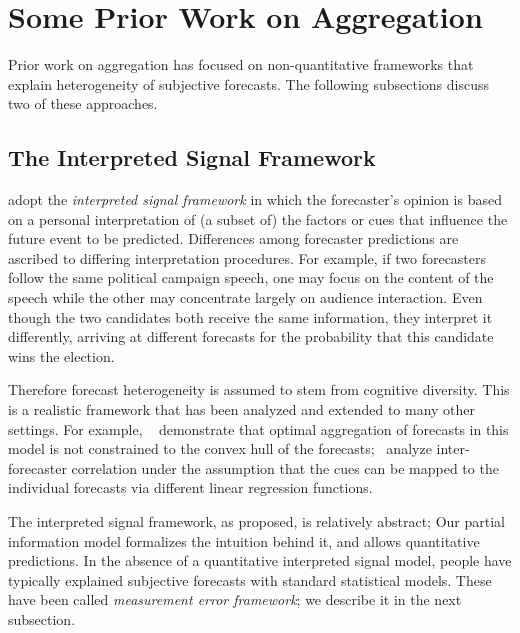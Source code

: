 \documentclass[11pt]{article}
\theoremstyle{definition}
\theoremstyle{definition}
\begin{document}
\section{Some Prior Work on Aggregation}
\label{sec:prior}

Prior work on aggregation has focused on non-quantitative frameworks
that explain heterogeneity of subjective forecasts.  The following
subsections discuss two of these approaches.

\subsection{The Interpreted Signal Framework}
\label{ss:inerpreted}

\citet{hong2009interpreted} adopt the {\em interpreted signal
framework} in which the forecaster's opinion is based on a personal
interpretation of (a subset of) the factors or cues that influence the
future event to be predicted.  Differences among forecaster
predictions are ascribed to differing interpretation procedures.  For
example, if two forecasters follow the same political campaign speech,
one may focus on the content of the speech while the other may
concentrate largely on audience interaction.  Even though the two
candidates both receive the same information, they interpret it
differently, arriving at different forecasts for the probability that
this candidate wins the election.

Therefore forecast heterogeneity is assumed to stem from cognitive
diversity.  This is a realistic framework that has been analyzed and
extended to many other settings.  For example,
~\citet{parunak2013characterizing} demonstrate that optimal
aggregation of forecasts in this model is not constrained to the
convex hull of the forecasts;~\citet{broomell2009experts} analyze
inter-forecaster correlation under the assumption that the cues can be
mapped to the individual forecasts via different linear regression
functions.

The interpreted signal framework, as proposed, is relatively abstract;
Our partial information model formalizes the intuition behind it, and
allows quantitative predictions. In the absence of a quantitative
interpreted signal model, people have typically explained subjective
forecasts with standard statistical models. These have been called
\textit{measurement error framework}; we describe it in the next
subsection.

%
\end{document}
